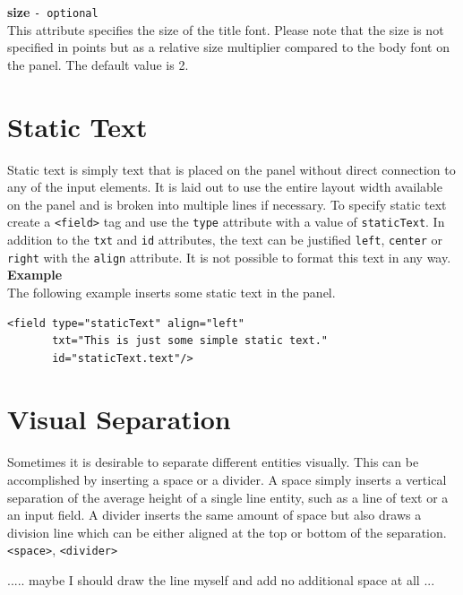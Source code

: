 \textbf{size} \texttt{- optional}\\

This attribute specifies the size of the title font. Please note that
the size is not specified in points but as a relative size multiplier
compared to the body font on the panel. The default value is 2.\\

\section{Static Text}

Static text is simply text that is placed on the panel without direct
connection to any of the input elements. It is laid out to use the
entire layout width available on the panel and is broken into multiple
lines if necessary. To specify static text create a \texttt{<field>} tag
and use the \texttt{type} attribute with a value of \texttt{staticText}.
In addition to the \texttt{txt} and \texttt{id} attributes, the text can
be justified \texttt{left}, \texttt{center} or \texttt{right} with the
\texttt{align} attribute. It is not possible to format this text in any way.\\

\textbf{Example}\\

The following example inserts some static text in the panel.

\footnotesize
\begin{verbatim}
<field type="staticText" align="left" 
       txt="This is just some simple static text."
       id="staticText.text"/>
\end{verbatim}
\normalsize

\section{Visual Separation}

Sometimes it is desirable to separate different entities visually. This
can be accomplished by inserting a space or a divider. A space simply
inserts a vertical separation of the average height of a single line
entity, such as a line of text or a an input field. A divider inserts
the same amount of space but also draws a division line which can be
either aligned at the top or bottom of the separation.
\texttt{<space>}, \texttt{<divider>}

 ..... maybe I should draw the line myself and add no additional space at all ...

